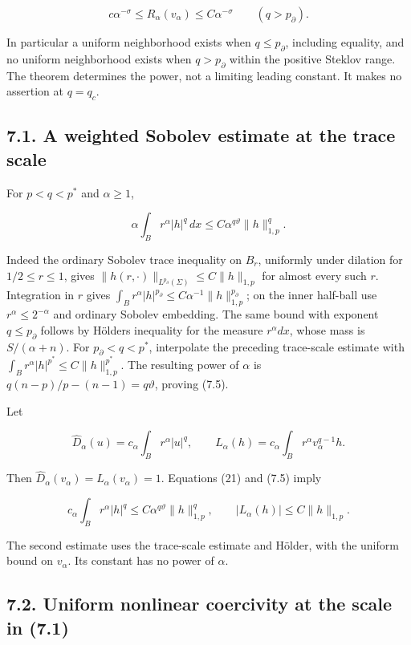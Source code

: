 \documentclass[11pt]{article}
\begin{document}
\[
c\alpha^{-\sigma}\le R_\alpha(v_\alpha)
\le C\alpha^{-\sigma}\qquad(q>p_\partial).
\tag{7.4}
\]

In particular a uniform neighborhood exists when \(q\le p_\partial\),
including equality, and no uniform neighborhood exists when
\(q>p_\partial\) within the positive Steklov range. The theorem
determines the power, not a limiting leading constant. It makes no
assertion at \(q=q_c\).

\subsection{7.1. A weighted Sobolev estimate at the trace
scale}\label{a-weighted-sobolev-estimate-at-the-trace-scale}

For \(p<q<p^*\) and \(\alpha\ge1\),

\[
\alpha\int_Br^\alpha|h|^q\,dx
\le C\alpha^{q\vartheta}\|h\|_{1,p}^q.
\tag{7.5}
\]

Indeed the ordinary Sobolev trace inequality on \(B_r\), uniformly under
dilation for \(1/2\le r\le1\), gives
\(\|h(r,\cdot)\|_{L^{p_\partial}(\Sigma)}\le C\|h\|_{1,p}\) for almost
every such \(r\). Integration in \(r\) gives
\(\int_Br^\alpha|h|^{p_\partial}\le C\alpha^{-1}\|h\|_{1,p}^{p_\partial}\);
on the inner half-ball use \(r^\alpha\le2^{-\alpha}\) and ordinary
Sobolev embedding. The same bound with exponent \(q\le p_\partial\)
follows by Hölder\textquotesingle s inequality for the measure
\(r^\alpha dx\), whose mass is \(S/(\alpha+n)\). For
\(p_\partial<q<p^*\), interpolate the preceding trace-scale estimate
with \(\int_Br^\alpha|h|^{p^*}\le C\|h\|_{1,p}^{p^*}\). The resulting
power of \(\alpha\) is \(q(n-p)/p-(n-1)=q\vartheta\), proving (7.5).

Let

\[
\widehat D_\alpha(u)=c_\alpha\int_Br^\alpha|u|^q,
\qquad L_\alpha(h)=c_\alpha\int_Br^\alpha v_\alpha^{q-1}h.
\tag{7.6}
\]

Then \(\widehat D_\alpha(v_\alpha)=L_\alpha(v_\alpha)=1\). Equations
(21) and (7.5) imply

\[
c_\alpha\int_Br^\alpha|h|^q
\le C\alpha^{q\vartheta}\|h\|_{1,p}^q,
\qquad |L_\alpha(h)|\le C\|h\|_{1,p}.
\tag{7.7}
\]

The second estimate uses the trace-scale estimate and Hölder, with the
uniform bound on \(v_\alpha\). Its constant has no power of \(\alpha\).

\subsection{7.2. Uniform nonlinear coercivity at the scale in
(7.1)}\label{uniform-nonlinear-coercivity-at-the-scale-in-7.1}
\end{document}
